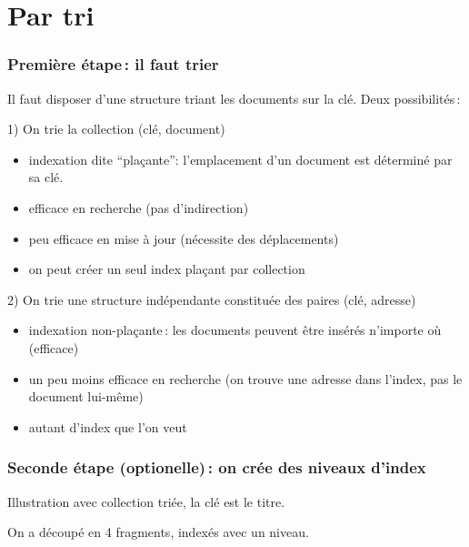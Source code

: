 \section{Par tri}

\begin{frame}
\frametitle{Première étape\,: il faut trier}

Il faut disposer d'une structure triant les documents sur la clé. Deux possibilités\,:

\vfill

\alert{1) On trie la collection (clé, document)}

\begin{itemize}
  \item indexation dite ``plaçante'': l'emplacement d'un document est déterminé par sa clé.
  \item efficace en recherche (pas d'indirection)
  \item peu efficace en mise à jour (nécessite des déplacements)  
  \item on peut créer un seul index plaçant par collection
\end{itemize}

\alert{2) On trie une structure indépendante constituée des paires (clé, adresse) }

\begin{itemize}
  \item indexation non-plaçante\,: les documents peuvent être insérés n'importe où (efficace)
  \item un peu moins efficace en recherche (on trouve une adresse dans l'index, pas le document lui-même)
  \item autant d'index que l'on veut
\end{itemize}

\end{frame}



\begin{frame}
\frametitle{Seconde étape (optionelle)\,: on crée des niveaux d'index}

Illustration avec \alert{collection triée}, la clé est le titre.


On a découpé en \alert{4 fragments}, 
indexés avec un niveau.

\end{frame}


